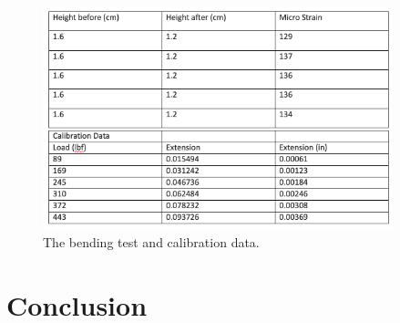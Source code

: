 \documentclass[12 pt]{report}
\begin{document}
\begin{figure}[htbp]
	\centering
	\includegraphics[width=4in]{images/Data}
	\caption{The bending test and calibration data.}
	\label{fig:data}
\end{figure}

\chapter{Conclusion} \label{ch:conclusion}
\end{document}
